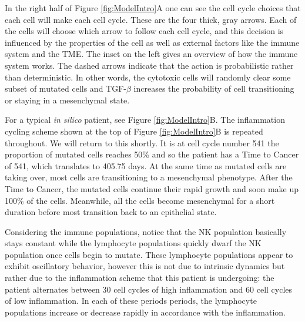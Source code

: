 \documentclass{article}
\begin{document}




In the right half of Figure \ref{fig:ModelIntro}A one can see the cell cycle choices that each cell will make each cell cycle.
These are the four thick, gray arrows.
Each of the cells will choose which arrow to follow each cell cycle, and this decision is influenced by the properties of the cell as well as external factors like the immune system and the TME.
The inset on the left gives an overview of how the immune system works.
The dashed arrows indicate that the action is probabilistic rather than deterministic.
In other words, the cytotoxic cells will randomly clear some subset of mutated cells and TGF-$\beta$ increases the probability of cell transitioning or staying in a mesenchymal state.

For a typical {\it in silico} patient, see Figure \ref{fig:ModelIntro}B.
The inflammation cycling scheme shown at the top of Figure \ref{fig:ModelIntro}B is repeated throughout.
We will return to this shortly.
It is at cell cycle number 541 the proportion of mutated cells reaches 50\% and so the patient has a Time to Cancer of 541, which translates to 405.75 days. %
At the same time as mutated cells are taking over, most cells are transitioning to a mesenchymal phenotype.
After the Time to Cancer, the mutated cells continue their rapid growth and soon make up 100\% of the cells.
Meanwhile, all the cells become mesenchymal for a short duration before most transition back to an epithelial state.

Considering the immune populations, notice that the NK population basically stays constant while the lymphocyte populations quickly dwarf the NK population once cells begin to mutate.
These lymphocyte populations appear to exhibit oscillatory behavior, however this is not due to intrinsic dynamics but rather due to the inflammation scheme that this patient is undergoing: 
the patient alternates between 30 cell cycles of high inflammation and 60 cell cycles of low inflammation.
In each of these periods periods, the lymphocyte populations increase or decrease rapidly in accordance with the inflammation.
\end{document}
